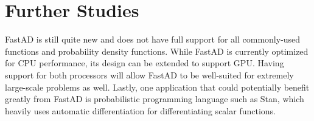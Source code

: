 \section{Further Studies}

FastAD is still quite new and 
does not have full support for all commonly-used functions
and probability density functions.
While FastAD is currently optimized for CPU performance,
its design can be extended to support GPU.\@
Having support for both processors will allow FastAD
to be well-suited for extremely large-scale problems as well.
Lastly, one application that could potentially benefit greatly from FastAD 
is probabilistic programming language such as Stan,
which heavily uses automatic differentiation for differentiating scalar functions.
